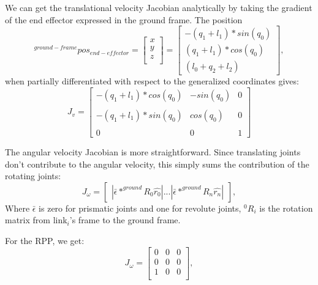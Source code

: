 \documentclass[12pt]{article}
\begin{document}
We can get the translational velocity Jacobian analytically by taking the gradient of the
end effector expressed in the ground frame. The position\\
\begin{equation}
  ^{ground-frame}pos_{end-effector}
  =
  \begin{bmatrix} x \\ y \\ z \\ \end{bmatrix} 
  = 
  \begin{bmatrix} 
    -(q_1 + l_1) * sin(q_0) \\
    (q_1 + l_1) * cos(q_0) \\
    (l_0+q_2 + l_2)
  \end{bmatrix},
\end{equation}
when partially differentiated with respect to the generalized coordinates gives:
\begin{equation}
  J_v = 
  \begin{bmatrix} 
    -(q_1 + l_1) * cos(q_0) & -sin(q_0) & 0 \\
    \\
    -(q_1 + l_1) * sin(q_0) & cos(q_0) & 0 \\ 
    \\
    0 & 0 & 1
  \end{bmatrix}
\end{equation}

The angular velocity Jacobian is more straightforward. Since translating joints don't
contribute to the angular velocity, this simply sums the contribution of the
rotating joints:
\begin{equation}
  J_\omega = 
  \begin{bmatrix} 
   | \bar{\epsilon} * ^{ground}R_0 \hat{r_0} | ... | \bar{\epsilon} * ^{ground}R_n \hat{r_n} |
  \end{bmatrix},
\end{equation}
Where $\bar{\epsilon}$ is zero for prismatic joints and one for revolute joints, $^0R_i$ is the
rotation matrix from link$_i$'s frame to the ground frame.

For the RPP, we get:
\begin{equation}
  J_\omega = 
  \begin{bmatrix} 
    0 & 0 & 0 \\
    0 & 0 & 0 \\
    1 & 0 & 0 \\
  \end{bmatrix},
\end{equation}
\end{document}
